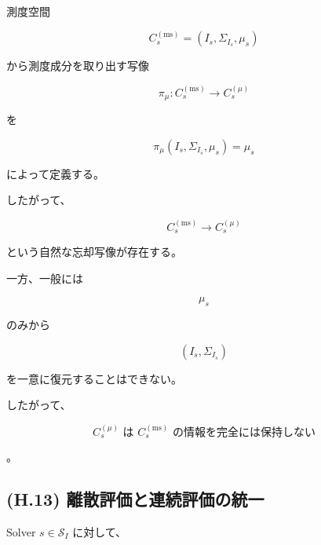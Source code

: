 \documentclass[a4paper,11pt]{article}
\begin{document}
測度空間

\begin{equation}
    C_s^{(\mathrm{ms})}
    =
    (I_s,\Sigma_{I_s},\mu_s)
\end{equation}

から測度成分を取り出す写像

\begin{equation}
    \pi_\mu:
    C_s^{(\mathrm{ms})}
    \longrightarrow
    C_s^{(\mu)}
\end{equation}

を

\begin{equation}
    \boxed{
        \pi_\mu
        (I_s,\Sigma_{I_s},\mu_s)
        =
        \mu_s
    }
    \label{eq:H-measure-projection}
\end{equation}

によって定義する。

したがって、

\begin{equation}
    C_s^{(\mathrm{ms})}
    \longrightarrow
    C_s^{(\mu)}
\end{equation}

という自然な忘却写像が存在する。

一方、一般には

\begin{equation}
    \mu_s
\end{equation}

のみから

\begin{equation}
    (I_s,\Sigma_{I_s})
\end{equation}

を一意に復元することはできない。

したがって、

\begin{equation}
    \boxed{
        C_s^{(\mu)}
        \text{ は }
        C_s^{(\mathrm{ms})}
        \text{ の情報を完全には保持しない}
    }
    \label{eq:H-measure-information-loss}
\end{equation}

。


\subsection{(H.13) 離散評価と連続評価の統一}
\label{subsec:H13}

Solver $s\in\mathcal{S}_I$ に対して、
\end{document}
